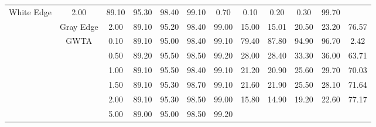 \begin{table}[htbp]
{\begin{tabular}{cc|c|ccccccccc}
  White Edge &
  2.00 &
  \multicolumn{1}{c|}{89.10} &
  \multicolumn{1}{c|}{95.30} &
  \multicolumn{1}{c|}{98.40} &
  \multicolumn{1}{c|}{99.10} &
  \multicolumn{1}{c|}{0.70} &
  \multicolumn{1}{c|}{0.10} &
  \multicolumn{1}{c|}{0.20} &
  \multicolumn{1}{c|}{0.30} &
  99.70 \\ \cline{2-12} 
\multicolumn{1}{c|}{} &
  Gray Edge &
  2.00 &
  \multicolumn{1}{c|}{89.10} &
  \multicolumn{1}{c|}{95.20} &
  \multicolumn{1}{c|}{98.40} &
  \multicolumn{1}{c|}{99.00} &
  \multicolumn{1}{c|}{15.00} &
  \multicolumn{1}{c|}{15.01} &
  \multicolumn{1}{c|}{20.50} &
  \multicolumn{1}{c|}{23.20} &
  76.57 \\ \cline{2-12} 
\multicolumn{1}{c|}{} &
  \multirow{9}{*}{GWTA}&
  0.10 &
  \multicolumn{1}{c|}{89.10} &
  \multicolumn{1}{c|}{95.00} &
  \multicolumn{1}{c|}{98.40} &
  \multicolumn{1}{c|}{99.10} &
  \multicolumn{1}{c|}{79.40} &
  \multicolumn{1}{c|}{87.80} &
  \multicolumn{1}{c|}{94.90} &
  \multicolumn{1}{c|}{96.70} &
  2.42 \\ \cline{3-12} 
\multicolumn{1}{c|}{} &
   &
  0.50 &
  \multicolumn{1}{c|}{89.20} &
  \multicolumn{1}{c|}{95.50} &
  \multicolumn{1}{c|}{98.50} &
  \multicolumn{1}{c|}{99.20} &
  \multicolumn{1}{c|}{28.00} &
  \multicolumn{1}{c|}{28.40} &
  \multicolumn{1}{c|}{33.30} &
  \multicolumn{1}{c|}{36.00} &
  63.71 \\ \cline{3-12} 
\multicolumn{1}{c|}{} &
   &
  1.00 &
  \multicolumn{1}{c|}{89.10} &
  \multicolumn{1}{c|}{95.50} &
  \multicolumn{1}{c|}{98.40} &
  \multicolumn{1}{c|}{99.10} &
  \multicolumn{1}{c|}{21.20} &
  \multicolumn{1}{c|}{20.90} &
  \multicolumn{1}{c|}{25.60} &
  \multicolumn{1}{c|}{29.70} &
  70.03 \\ \cline{3-12} 
\multicolumn{1}{c|}{} &
   &
  1.50 &
  \multicolumn{1}{c|}{89.10} &
  \multicolumn{1}{c|}{95.30} &
  \multicolumn{1}{c|}{98.70} &
  \multicolumn{1}{c|}{99.10} &
  \multicolumn{1}{c|}{21.60} &
  \multicolumn{1}{c|}{21.90} &
  \multicolumn{1}{c|}{25.50} &
  \multicolumn{1}{c|}{28.10} &
  71.64 \\ \cline{3-12} 
\multicolumn{1}{c|}{} &
   &
  2.00 &
  \multicolumn{1}{c|}{89.10} &
  \multicolumn{1}{c|}{95.30} &
  \multicolumn{1}{c|}{98.50} &
  \multicolumn{1}{c|}{99.00} &
  \multicolumn{1}{c|}{15.80} &
  \multicolumn{1}{c|}{14.90} &
  \multicolumn{1}{c|}{19.20} &
  \multicolumn{1}{c|}{22.60} &
  77.17 \\ \cline{3-12} 
\multicolumn{1}{c|}{} &
   &
  5.00 &
  \multicolumn{1}{c|}{89.00} &
  \multicolumn{1}{c|}{95.00} &
  \multicolumn{1}{c|}{98.50} &
  \multicolumn{1}{c|}{99.20} &

\end{tabular}}
\end{table}
